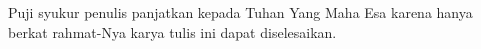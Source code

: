 Puji syukur penulis panjatkan kepada Tuhan Yang Maha Esa karena hanya
berkat rahmat-Nya karya tulis ini dapat diselesaikan.
